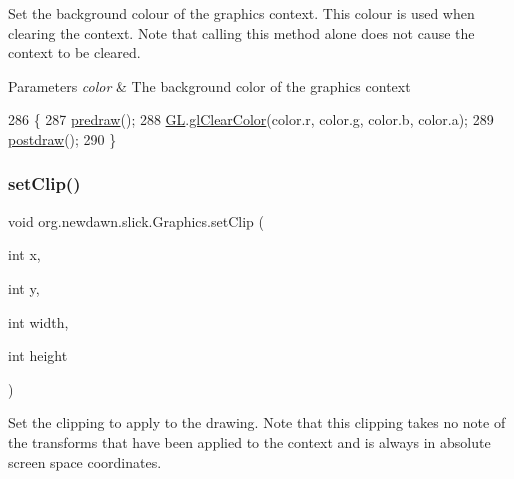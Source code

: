 Set the background colour of the graphics context. This colour is used when clearing the context. Note that calling this method alone does not cause the context to be cleared.


\begin{DoxyParams}{Parameters}
{\em color} & The background color of the graphics context \\
\hline
\end{DoxyParams}

\begin{DoxyCode}
286                                            \{
287         \mbox{\hyperlink{classorg_1_1newdawn_1_1slick_1_1_graphics_a7b4c203181e3b6302d51ed9b24596b8d}{predraw}}();
288         \mbox{\hyperlink{classorg_1_1newdawn_1_1slick_1_1_graphics_a39ca68db81b225982a4421c4a6835eed}{GL}}.\mbox{\hyperlink{interfaceorg_1_1newdawn_1_1slick_1_1opengl_1_1renderer_1_1_s_g_l_ad629840de5bb3d1baed92ccf8085068b}{glClearColor}}(color.r, color.g, color.b, color.a);
289         \mbox{\hyperlink{classorg_1_1newdawn_1_1slick_1_1_graphics_abe054371d1486618ff327bbbcf02ff97}{postdraw}}();
290     \}
\end{DoxyCode}
\mbox{\label{classorg_1_1newdawn_1_1slick_1_1_graphics_abeab2710876092eecc384bc6221203e5}} 
\subsubsection{\texorpdfstring{set\+Clip()}{setClip()}\hspace{0.1cm}{\footnotesize\ttfamily [1/2]}}
{\footnotesize\ttfamily void org.\+newdawn.\+slick.\+Graphics.\+set\+Clip (\begin{DoxyParamCaption}\item[{int}]{x,  }\item[{int}]{y,  }\item[{int}]{width,  }\item[{int}]{height }\end{DoxyParamCaption})\hspace{0.3cm}{\ttfamily [inline]}}

Set the clipping to apply to the drawing. Note that this clipping takes no note of the transforms that have been applied to the context and is always in absolute screen space coordinates.


